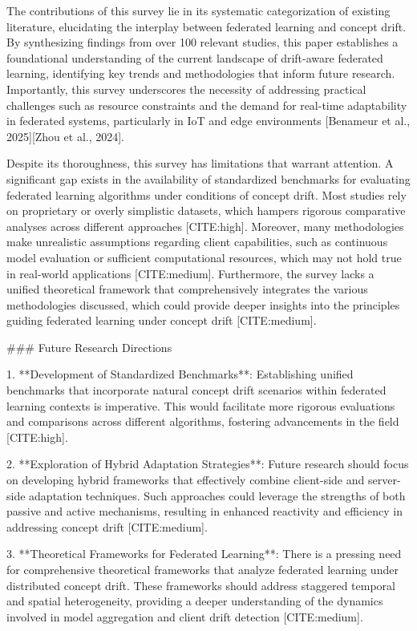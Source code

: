\documentclass[journal]{IEEEtran}
\begin{document}
The contributions of this survey lie in its systematic categorization of existing literature, elucidating the interplay between federated learning and concept drift. By synthesizing findings from over 100 relevant studies, this paper establishes a foundational understanding of the current landscape of drift-aware federated learning, identifying key trends and methodologies that inform future research. Importantly, this survey underscores the necessity of addressing practical challenges such as resource constraints and the demand for real-time adaptability in federated systems, particularly in IoT and edge environments [Benameur et al., 2025][Zhou et al., 2024].

Despite its thoroughness, this survey has limitations that warrant attention. A significant gap exists in the availability of standardized benchmarks for evaluating federated learning algorithms under conditions of concept drift. Most studies rely on proprietary or overly simplistic datasets, which hampers rigorous comparative analyses across different approaches [CITE:high]. Moreover, many methodologies make unrealistic assumptions regarding client capabilities, such as continuous model evaluation or sufficient computational resources, which may not hold true in real-world applications [CITE:medium]. Furthermore, the survey lacks a unified theoretical framework that comprehensively integrates the various methodologies discussed, which could provide deeper insights into the principles guiding federated learning under concept drift [CITE:medium].

\#\#\# Future Research Directions

1. **Development of Standardized Benchmarks**: Establishing unified benchmarks that incorporate natural concept drift scenarios within federated learning contexts is imperative. This would facilitate more rigorous evaluations and comparisons across different algorithms, fostering advancements in the field [CITE:high].

2. **Exploration of Hybrid Adaptation Strategies**: Future research should focus on developing hybrid frameworks that effectively combine client-side and server-side adaptation techniques. Such approaches could leverage the strengths of both passive and active mechanisms, resulting in enhanced reactivity and efficiency in addressing concept drift [CITE:medium].

3. **Theoretical Frameworks for Federated Learning**: There is a pressing need for comprehensive theoretical frameworks that analyze federated learning under distributed concept drift. These frameworks should address staggered temporal and spatial heterogeneity, providing a deeper understanding of the dynamics involved in model aggregation and client drift detection [CITE:medium].
\end{document}
